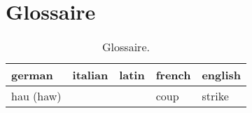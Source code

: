 \chapter{Glossaire}

\begin{table}[h]
	\centering
	\begin{tabular}{lllll}
		german &
			italian &
			latin &
			french &
			english \\
		\hline
		hau (haw) &
			&
			&
			coup &
			strike
	\end{tabular}
	\caption{Glossaire.}
\end{table}


